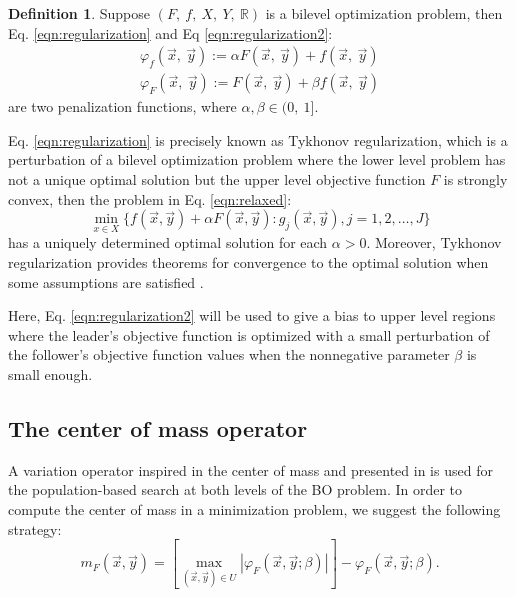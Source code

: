 \documentclass[conference]{IEEEtran}
\theoremstyle{definition}
\newtheorem{definition}{Definition}[section]
\begin{document}
\begin{definition}
    Suppose $(F, \ f, \ X, \ Y, \ \mathbb{R} )$ is a bilevel optimization problem,
    then Eq. \ref{eqn:regularization} and Eq \ref{eqn:regularization2}:
    \begin{align}
        \label{eqn:regularization}
        \varphi_f (\vec{x},\ \vec{y}) := \alpha F(\vec{x},\ \vec{y}) +  f(\vec{x},\ \vec{y}) \\
        \label{eqn:regularization2}
        \varphi_F (\vec{x},\ \vec{y}) := F(\vec{x},\ \vec{y}) +  \beta f(\vec{x},\ \vec{y})
    \end{align}
    are two penalization functions, where $\alpha, \beta \in (0,\ 1]$.
\end{definition}
% 
Eq. \ref{eqn:regularization} is precisely known as Tykhonov regularization, which is a
perturbation of a bilevel optimization problem where the lower level problem has
not a unique optimal solution but the upper level objective function $F$ is 
strongly convex, then the problem in Eq. \ref{eqn:relaxed}:
\begin{equation}
    \min_{x \in X} \{ f(\vec{x},\vec{y}) + \alpha F(\vec{x}, \vec{y}) : g_j(\vec{x}, \vec{y}), j=1,2,\ldots, J\} 
    \label{eqn:relaxed}
\end{equation}
% 
has a uniquely determined optimal solution for each $\alpha > 0$. 
Moreover, Tykhonov regularization provides theorems for convergence to the optimal
solution when some assumptions are satisfied \cite{dempe2002foundations}. 

Here, Eq. \ref{eqn:regularization2} will be used to give a bias to upper level
regions where the leader's objective function is optimized with a small perturbation
of the follower's objective function values when the nonnegative parameter $\beta$
is small enough. 



\subsection{The center of mass operator} %
\label{sub:the_center_operator}
% 

A variation operator inspired in the center of mass and presented in \cite{Mejia2018}
is used for the population-based search at both levels of the BO problem. In order
to compute the center of mass in a minimization problem, we suggest the following
strategy:
% 
\[
    m_F(\vec{x}, \vec{y}) = \left[ \max_{(\vec{x}, \vec{y})\in U} |\varphi_F (\vec{x}, \vec{y}; \beta)| \right]
                            - \varphi_F (\vec{x}, \vec{y}; \beta).
\]
\end{document}
